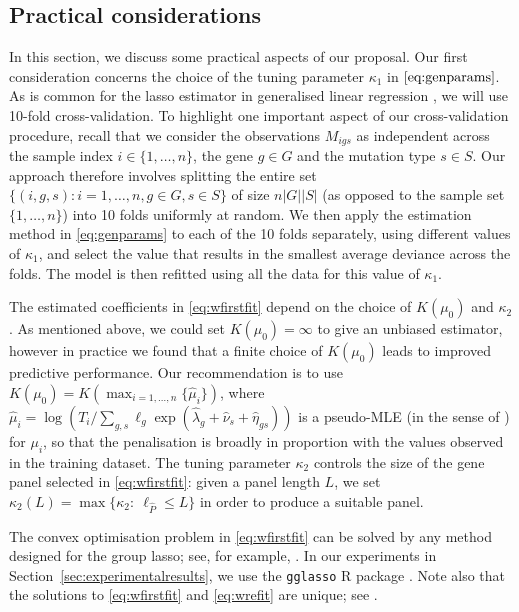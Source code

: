 \documentclass[12pt]{article}
\begin{document}
\subsection{Practical considerations \label{sec:practicalconsiderations}}
In this section, we discuss some practical aspects of our proposal.  Our first consideration concerns the choice of the tuning parameter $\kappa_1$ in $\eqref{eq:genparams}$.  As is common for the \acrshort{lasso} estimator in generalised linear regression \citep[see, for example,][] {michoel_natural_2016, friedman_glmnet_2020}, we will use 10-fold cross-validation.  To highlight one important aspect of our cross-validation procedure, recall that we consider the observations $M_{igs}$ as independent across the sample index $i \in \{1, \ldots, n\}$, the gene $g\in G$ and the mutation type $s\in S$. Our approach therefore involves splitting the entire set $\{(i,g,s): i = 1, \ldots, n, g \in G, s \in S\}$ of size $n|G||S|$ (as opposed to the sample set $\{1, \ldots, n\}$) into 10 folds uniformly at random. We then apply the estimation method in \eqref{eq:genparams} to each of the 10 folds separately, using different values of $\kappa_1$, and select the value that results in the smallest average deviance across the folds. The model is then refitted using all the data for this value of $\kappa_1$. 

The estimated coefficients in \eqref{eq:wfirstfit} depend on the choice of $K(\mu_0)$ and $\kappa_2$.  As mentioned above, we could set $K(\mu_0) = \infty$ to give an unbiased estimator, however in practice we found that a finite choice of $K(\mu_0)$ leads to improved predictive performance. Our recommendation is to use $K(\mu_0) = K(\max_{i=1,\ldots, n}\{\hat{\mu}_i\})$, where $\hat{\mu}_i = \log(T_i/\sum_{g,s}\ell_g\exp(\hat{\lambda}_g + \hat{\nu}_s + \hat{\eta}_{gs}))$ is a pseudo-MLE (in the sense of \citet{gong_pseudo_1981}) for $\mu_i$, so that the penalisation is broadly in proportion with the values observed in the training dataset. The tuning parameter $\kappa_2$ controls the size of the gene panel selected in \eqref{eq:wfirstfit}: given a panel length $L$, we set $\kappa_2(L) = \max \{\kappa_2: \ \ell_{\hat{P}} \leq L \}$ in order to produce a suitable panel. %


The convex optimisation problem in \eqref{eq:wfirstfit} can be solved by any method designed for the group \acrshort{lasso}; see, for example, \citet{yang_fast_2015}. In our experiments in Section~\ref{sec:experimentalresults}, we use the \texttt{gglasso} R package \citep{yang_gglasso_2020}. Note also that the solutions to \eqref{eq:wfirstfit} and \eqref{eq:wrefit} are unique; see \citet[Theorem~1]{roth_group-lasso_2008}.
\end{document}
